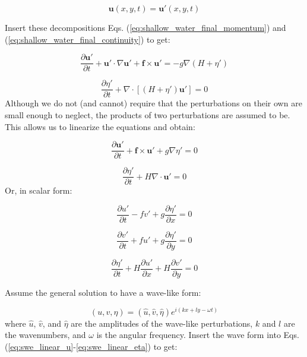 \documentclass[12pt]{article}
\numberwithin{equation}{section}
\numberwithin{figure}{section}
\numberwithin{table}{section}
\begin{document}
\begin{equation}
  \mathbf{u}(x, y, t) = \mathbf{u}'(x, y, t)
\end{equation}

Insert these decompositions Eqs. (\ref{eq:shallow_water_final_momentum})
and (\ref{eq:shallow_water_final_continuity}) to get:

\begin{equation}
  \frac{\partial \mathbf{u}'}{\partial t} + 
  \mathbf{u}' \cdot \nabla \mathbf{u}' +
  \mathbf{f} \times \mathbf{u}' =
  - g \nabla \left( H + \eta' \right)
\end{equation}

\begin{equation}
  \frac{\partial \eta'}{\partial t} + \nabla \cdot \left[ (H + \eta') \mathbf{u}' \right] = 0
\end{equation}
Although we do not (and cannot) require that the perturbations on their own
are small enough to neglect, the products of two perturbations are assumed to
be.
This allows us to linearize the equations and obtain:

\begin{equation}
  \frac{\partial \mathbf{u}'}{\partial t} + 
  \mathbf{f} \times \mathbf{u}' +
  g \nabla \eta' = 0
\end{equation}

\begin{equation}
  \frac{\partial \eta'}{\partial t} + H \nabla \cdot \mathbf{u}' = 0
\end{equation}
Or, in scalar form:

\begin{equation}
  \frac{\partial u'}{\partial t} - f v' + g \frac{\partial \eta'}{\partial x} = 0
  \label{eq:swe_linear_u}
\end{equation}

\begin{equation}
  \frac{\partial v'}{\partial t} + f u' + g \frac{\partial \eta'}{\partial y} = 0
  \label{eq:swe_linear_v}
\end{equation}

\begin{equation}
  \frac{\partial \eta'}{\partial t} + H \frac{\partial u'}{\partial x} + H \frac{\partial v'}{\partial y} = 0
  \label{eq:swe_linear_eta}
\end{equation}

Assume the general solution to have a wave-like form:

\begin{equation}
  (u, v, \eta) = (\widehat{u}, \widehat{v}, \widehat{\eta}) e^{i(kx + ly - \omega t)}
\end{equation}
where $\widehat{u}$, $\widehat{v}$, and $\widehat{\eta}$ are the amplitudes of the
wave-like perturbations, $k$ and $l$ are the wavenumbers, and $\omega$ is the
angular frequency.
Insert the wave form into Eqs. (\ref{eq:swe_linear_u}-\ref{eq:swe_linear_eta})
to get:
\end{document}
